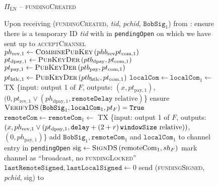 
  \begin{figure}[H]
    \begin{protocolbox}{$\Pi_{\mathrm{LN}}$ -- \textsc{fundingCreated}}
      \begin{algorithmic}[1]
        \State Upon receiving (\textsc{fundingCreated}, \textit{tid},
        \textit{pchid}, $\mathtt{BobSig}_1$) from \bob:
        \Indent
          \State ensure there is a temporary ID \textit{tid} with \bob{} in
          \texttt{pendingOpen} on which we have sent up to
          \textsc{acceptChannel}
          \State $ph_{\mathrm{rev}, 1} \gets
          \textsc{CombinePubKey}\left(phb_{\mathrm{rev}} pt_{\mathrm{com},
          1}\right)$
          \State $pt_{\mathrm{dpay}, 1} \gets
          \textsc{PubKeyDer}\left(ptb_{\mathrm{dpay}}, pt_{\mathrm{com},
          1}\right)$
          \State $pt_{\mathrm{pay}, 1} \gets
          \textsc{PubKeyDer}\left(ptb_{\mathrm{pay}}, pt_{\mathrm{com},
          1}\right)$
          \State $pt_{\mathrm{htlc}, 1} \gets
          \textsc{PubKeyDer}\left(ptb_{\mathrm{htlc}}, pt_{\mathrm{com},
          1}\right)$
          \State $\mathtt{localCom} \gets \mathtt{localCom}_1 \gets$ TX \{input:
          output 1 of $F$, outputs: $(x, pt_{\mathrm{pay}, 1})$, $(0,
          pt_{\mathrm{rev}, 1} \vee (ph_{\mathrm{dpay}, 1}, \mathtt{remoteDelay}
          \text{ relative})$\}
          \State ensure $\textsc{VerifyDS}\left(\mathtt{BobSig}_1,
          \mathtt{localCom}_1, pt_F\right) = \mathtt{True}$
          \State $\mathtt{remoteCom} \gets \mathtt{remoteCom}_1 \gets$ TX
          \{input: output 1 of $F$, outputs: $(x, ph_{\mathrm{rev}, 1} \vee
          (pt_{\mathrm{dpay}, 1}, \mathtt{delay} + \left(2 + r\right)\texttt{windowSize}{} \text{
          relative}))$, $(0, ph_{\mathrm{pay}, 1})$\}
          \State add $\mathtt{BobSig}_1, \mathtt{remoteCom}_1$ and
          $\mathtt{localCom}_1$ to channel entry in \texttt{pendingOpen}
          \State $\mathrm{sig} \gets \textsc{SignDS}\left(\mathrm{remoteCom}_1,
          sh_F\right)$
          \State mark channel as ``broadcast, no \textsc{fundingLocked}''
          \label{alg:protocol:open:fundingCreated:mark}
          \State $\mathtt{lastRemoteSigned}, \mathtt{lastLocalSigned} \gets 0$
          \State send (\textsc{fundingSigned}, \textit{pchid}, sig) to \bob{}
        \EndIndent
      \end{algorithmic}
    \end{protocolbox}
    \caption{}
    \label{alg:protocol:open:fundingCreated}
  \end{figure}

